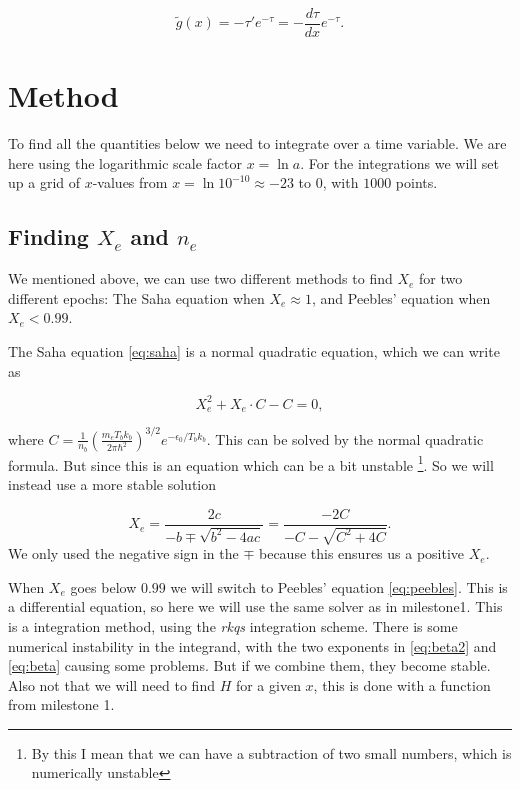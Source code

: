 \documentclass[a4paper,norsk, 10pt]{article}
\begin{document}
\begin{equation}\label{eq:g}
\tilde{g} (x) = -\tau'e^{-\tau} = -\frac{d\tau}{dx}e^{-\tau}.
\end{equation}


\section{Method}
To find all the quantities below we need to integrate over a time variable. We are here using the logarithmic scale factor $x = \ln a$. For the integrations we will set up a grid of $x$-values from $x = \ln 10^{-10} \approx -23$ to $0$, with $1000$ points.

\subsection{Finding $X_e$ and $n_e$}
We mentioned above, we can use two different methods to find $X_e$ for two different epochs: The Saha equation when $X_e \approx 1$, and Peebles' equation when $X_e < 0.99$. 

The Saha equation \eqref{eq:saha} is a normal quadratic equation, which we can write as

\begin{equation}
X_e^2 + X_e\cdot C - C = 0,
\end{equation}

where $C = \frac{1}{n_b}\left(\frac{m_e T_b k_b}{2\pi \hbar^2}\right)^{3/2} e^{-\epsilon_0/T_b k_b}$. This can be solved by the normal quadratic formula. But since this is an equation which can be a bit unstable \footnote{By this I mean that we can have a subtraction of two small numbers, which is numerically unstable}. So we will instead use a more stable solution

\begin{equation}
X_e = \frac{2c}{-b \mp \sqrt{b^2 - 4ac}} = \frac{-2C}{-C - \sqrt{C^2 + 4C}}.
\end{equation}
We only used the negative sign in the $\mp$ because this ensures us a positive $X_e$.

When $X_e$ goes below $0.99$ we will switch to Peebles' equation \eqref{eq:peebles}. This is a differential equation, so here we will use the same solver as in milestone1. This is a integration method, using the \textit{rkqs} integration scheme. There is some numerical instability in the integrand, with the two exponents in \eqref{eq:beta2} and \eqref{eq:beta} causing some problems. But if we combine them, they become stable. Also not that we will need to find $H$ for a given $x$, this is done with a function from milestone 1.
\end{document}
